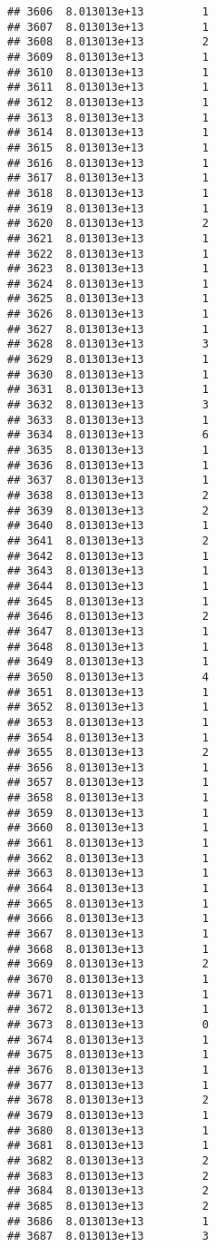 \documentclass[
]{article}
\begin{document}
\begin{verbatim}
## 3606  8.013013e+13         1
## 3607  8.013013e+13         1
## 3608  8.013013e+13         2
## 3609  8.013013e+13         1
## 3610  8.013013e+13         1
## 3611  8.013013e+13         1
## 3612  8.013013e+13         1
## 3613  8.013013e+13         1
## 3614  8.013013e+13         1
## 3615  8.013013e+13         1
## 3616  8.013013e+13         1
## 3617  8.013013e+13         1
## 3618  8.013013e+13         1
## 3619  8.013013e+13         1
## 3620  8.013013e+13         2
## 3621  8.013013e+13         1
## 3622  8.013013e+13         1
## 3623  8.013013e+13         1
## 3624  8.013013e+13         1
## 3625  8.013013e+13         1
## 3626  8.013013e+13         1
## 3627  8.013013e+13         1
## 3628  8.013013e+13         3
## 3629  8.013013e+13         1
## 3630  8.013013e+13         1
## 3631  8.013013e+13         1
## 3632  8.013013e+13         3
## 3633  8.013013e+13         1
## 3634  8.013013e+13         6
## 3635  8.013013e+13         1
## 3636  8.013013e+13         1
## 3637  8.013013e+13         1
## 3638  8.013013e+13         2
## 3639  8.013013e+13         2
## 3640  8.013013e+13         1
## 3641  8.013013e+13         2
## 3642  8.013013e+13         1
## 3643  8.013013e+13         1
## 3644  8.013013e+13         1
## 3645  8.013013e+13         1
## 3646  8.013013e+13         2
## 3647  8.013013e+13         1
## 3648  8.013013e+13         1
## 3649  8.013013e+13         1
## 3650  8.013013e+13         4
## 3651  8.013013e+13         1
## 3652  8.013013e+13         1
## 3653  8.013013e+13         1
## 3654  8.013013e+13         1
## 3655  8.013013e+13         2
## 3656  8.013013e+13         1
## 3657  8.013013e+13         1
## 3658  8.013013e+13         1
## 3659  8.013013e+13         1
## 3660  8.013013e+13         1
## 3661  8.013013e+13         1
## 3662  8.013013e+13         1
## 3663  8.013013e+13         1
## 3664  8.013013e+13         1
## 3665  8.013013e+13         1
## 3666  8.013013e+13         1
## 3667  8.013013e+13         1
## 3668  8.013013e+13         1
## 3669  8.013013e+13         2
## 3670  8.013013e+13         1
## 3671  8.013013e+13         1
## 3672  8.013013e+13         1
## 3673  8.013013e+13         0
## 3674  8.013013e+13         1
## 3675  8.013013e+13         1
## 3676  8.013013e+13         1
## 3677  8.013013e+13         1
## 3678  8.013013e+13         2
## 3679  8.013013e+13         1
## 3680  8.013013e+13         1
## 3681  8.013013e+13         1
## 3682  8.013013e+13         2
## 3683  8.013013e+13         2
## 3684  8.013013e+13         2
## 3685  8.013013e+13         2
## 3686  8.013013e+13         1
## 3687  8.013013e+13         3

\end{verbatim}
\end{document}
